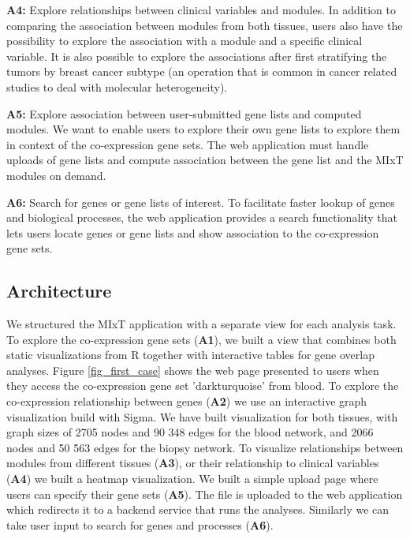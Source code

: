 \textbf{A4:} Explore relationships between clinical variables and modules. In
addition to comparing the association between modules from both tissues, users
also have the possibility to explore the association with a module and a
specific clinical variable. It is also possible to explore the associations
after first stratifying the tumors by breast cancer subtype (an operation that
is common in cancer related studies to deal with molecular heterogeneity).

\textbf{A5:} Explore association between user-submitted gene lists and computed
modules. We want to enable users to explore their own gene lists to explore
them in context of the co-expression gene sets. The web application must handle
uploads of gene lists and compute association between the gene list and the MIxT
modules on demand. 

\textbf{A6:} Search for genes or gene lists of interest. To facilitate faster
lookup of genes and biological processes, the web application provides a search
functionality that lets users locate genes or gene lists and show association to
the co-expression gene sets. 

\subsection{Architecture} 
We structured the MIxT application with a separate view for each analysis task.
To explore the co-expression gene sets (\textbf{A1}), we built a view that
combines both static visualizations from R together with interactive tables for
gene overlap analyses. Figure \ref{fig_first_case} shows the web page presented
to users when they access the co-expression gene set 'darkturquoise' from blood.
To explore the co-expression relationship between genes (\textbf{A2}) we use an
interactive graph visualization build with Sigma.\cite{sigmajs}
We have built visualization for both tissues, with graph sizes of 2705 nodes and
90 348 edges for the blood network, and 2066 nodes and 50 563 edges for the
biopsy network. 
To visualize relationships between modules from different tissues (\textbf{A3}),
or their relationship to clinical variables (\textbf{A4}) we built a heatmap
visualization.
We built a simple upload page where users can specify their gene sets
(\textbf{A5}). The file is uploaded to the web application which redirects it to
a backend service that runs the analyses. Similarly we can take user input to
search for genes and processes (\textbf{A6}).

